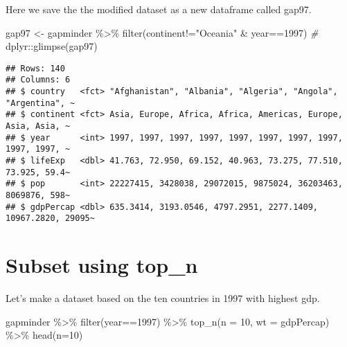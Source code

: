 \documentclass[
]{book}
\newenvironment{Shaded}{\begin{snugshade}}{\end{snugshade}}
\newcommand{\AttributeTok}[1]{\textcolor[rgb]{0.77,0.63,0.00}{#1}}
\newcommand{\CommentTok}[1]{\textcolor[rgb]{0.56,0.35,0.01}{\textit{#1}}}
\newcommand{\DecValTok}[1]{\textcolor[rgb]{0.00,0.00,0.81}{#1}}
\newcommand{\FunctionTok}[1]{\textcolor[rgb]{0.00,0.00,0.00}{#1}}
\newcommand{\NormalTok}[1]{#1}
\newcommand{\OtherTok}[1]{\textcolor[rgb]{0.56,0.35,0.01}{#1}}
\newcommand{\SpecialCharTok}[1]{\textcolor[rgb]{0.00,0.00,0.00}{#1}}
\newcommand{\StringTok}[1]{\textcolor[rgb]{0.31,0.60,0.02}{#1}}
\begin{document}
Here we save the the modified dataset as a new dataframe called gap97.

\begin{Shaded}
\begin{Highlighting}[]
\NormalTok{gap97 }\OtherTok{\textless{}{-}}\NormalTok{ gapminder }\SpecialCharTok{\%\textgreater{}\%} 
  \FunctionTok{filter}\NormalTok{(continent}\SpecialCharTok{!=}\StringTok{"Oceania"} \SpecialCharTok{\&}\NormalTok{ year}\SpecialCharTok{==}\DecValTok{1997}\NormalTok{) }
\CommentTok{\#}
\NormalTok{dplyr}\SpecialCharTok{::}\FunctionTok{glimpse}\NormalTok{(gap97)}
\end{Highlighting}
\end{Shaded}

\begin{verbatim}
## Rows: 140
## Columns: 6
## $ country   <fct> "Afghanistan", "Albania", "Algeria", "Angola", "Argentina", ~
## $ continent <fct> Asia, Europe, Africa, Africa, Americas, Europe, Asia, Asia, ~
## $ year      <int> 1997, 1997, 1997, 1997, 1997, 1997, 1997, 1997, 1997, 1997, ~
## $ lifeExp   <dbl> 41.763, 72.950, 69.152, 40.963, 73.275, 77.510, 73.925, 59.4~
## $ pop       <int> 22227415, 3428038, 29072015, 9875024, 36203463, 8069876, 598~
## $ gdpPercap <dbl> 635.3414, 3193.0546, 4797.2951, 2277.1409, 10967.2820, 29095~
\end{verbatim}

\hypertarget{subset-using-top_n}{%
\section{Subset using top\_n}\label{subset-using-top_n}}

Let's make a dataset based on the ten countries in 1997 with highest gdp.

\begin{Shaded}
\begin{Highlighting}[]
\NormalTok{gapminder }\SpecialCharTok{\%\textgreater{}\%} \FunctionTok{filter}\NormalTok{(year}\SpecialCharTok{==}\DecValTok{1997}\NormalTok{) }\SpecialCharTok{\%\textgreater{}\%}
  \FunctionTok{top\_n}\NormalTok{(}\AttributeTok{n =} \DecValTok{10}\NormalTok{, }\AttributeTok{wt =}\NormalTok{ gdpPercap) }\SpecialCharTok{\%\textgreater{}\%}
  \FunctionTok{head}\NormalTok{(}\AttributeTok{n=}\DecValTok{10}\NormalTok{)}
\end{Highlighting}
\end{Shaded}
\end{document}
